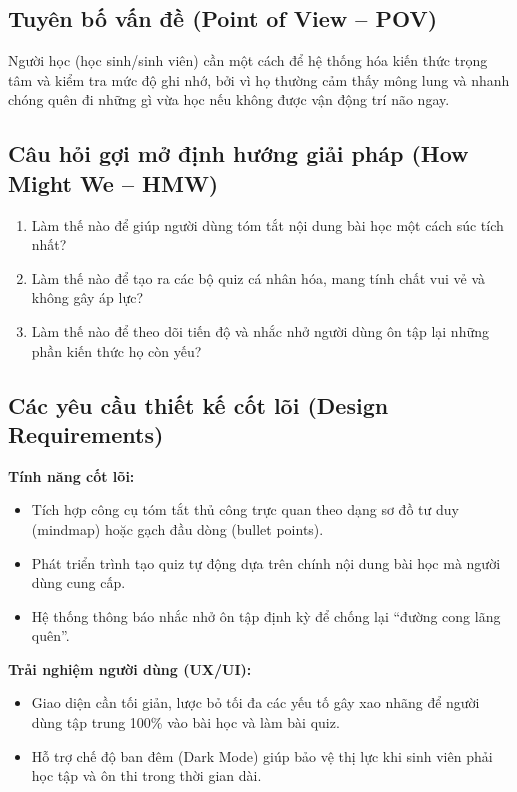 \documentclass[12pt,a4paper]{report}
\begin{document}
\subsection*{Tuyên bố vấn đề (Point of View -- POV)}
Người học (học sinh/sinh viên) cần một cách để hệ thống hóa kiến thức trọng tâm và kiểm tra mức độ ghi nhớ, bởi vì họ thường cảm thấy mông lung và nhanh chóng quên đi những gì vừa học nếu không được vận động trí não ngay.

\subsection*{Câu hỏi gợi mở định hướng giải pháp (How Might We -- HMW)}
\begin{enumerate}
  \item Làm thế nào để giúp người dùng tóm tắt nội dung bài học một cách súc tích nhất?
  \item Làm thế nào để tạo ra các bộ quiz cá nhân hóa, mang tính chất vui vẻ và không gây áp lực?
  \item Làm thế nào để theo dõi tiến độ và nhắc nhở người dùng ôn tập lại những phần kiến thức họ còn yếu?
\end{enumerate}

\subsection*{Các yêu cầu thiết kế cốt lõi (Design Requirements)}
\textbf{Tính năng cốt lõi:}
\begin{itemize}
  \item Tích hợp công cụ tóm tắt thủ công trực quan theo dạng sơ đồ tư duy (mindmap) hoặc gạch đầu dòng (bullet points).
  \item Phát triển trình tạo quiz tự động dựa trên chính nội dung bài học mà người dùng cung cấp.
  \item Hệ thống thông báo nhắc nhở ôn tập định kỳ để chống lại ``đường cong lãng quên''.
\end{itemize}

\textbf{Trải nghiệm người dùng (UX/UI):}
\begin{itemize}
  \item Giao diện cần tối giản, lược bỏ tối đa các yếu tố gây xao nhãng để người dùng tập trung 100\% vào bài học và làm bài quiz.
  \item Hỗ trợ chế độ ban đêm (Dark Mode) giúp bảo vệ thị lực khi sinh viên phải học tập và ôn thi trong thời gian dài.
\end{itemize}
\end{document}
